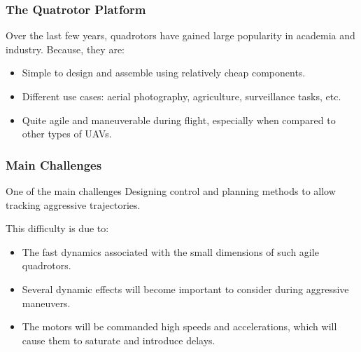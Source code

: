 \documentclass{thesisbeamer}
\newcommand\Fontvi{\fontsize{9}{10}\selectfont}
\begin{document}
\begin{frame}
\frametitle{The Quatrotor Platform}
\Fontvi

Over the last few years, quadrotors have gained large popularity in academia and industry. Because, they are:

\begin{itemize}
	\item Simple to design and assemble using relatively cheap components.
	\item Different use cases: aerial photography, agriculture, surveillance tasks, etc.
	\item Quite agile and maneuverable during flight, especially when compared to other types of UAVs.
\end{itemize}

\end{frame}

\begin{frame}
\frametitle{Main Challenges}
\Fontvi

\begin{block}{One of the main challenges}
	Designing control and planning methods to allow tracking aggressive trajectories.
\end{block}

This difficulty is due to: 
\begin{itemize}
	\item The fast dynamics associated with the small dimensions of such agile quadrotors.
	\item Several dynamic effects will become important to consider during aggressive maneuvers.
	\item The motors will be commanded high speeds and accelerations, which will cause them to saturate and introduce delays.
\end{itemize}


\end{frame}
\end{document}
